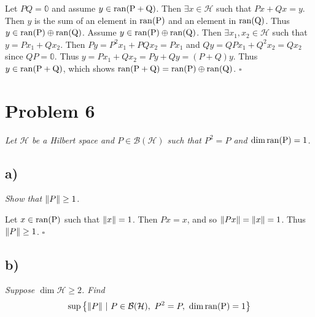 \documentclass[12pt]{article}
\theoremstyle{plain}
\begin{document}
Let $PQ = \mathbb{0}$ and assume $y \in \rm{ran}(P + Q)$.  Then $\exists x \in \mathcal{H}$ such that $Px + Qx = y$.  Then $y$ is the sum of an element in $\rm{ran}(P)$ and an element in $\rm{ran}(Q)$.  Thus $y \in \rm{ran}(P) \oplus \rm{ran}(Q)$.  Assume $y \in \rm{ran}(P) \oplus \rm{ran}(Q)$.  Then $\exists x_1, x_2 \in \mathcal{H}$ such that $y = Px_1 + Qx_2$.  Then $Py = P^2x_1 + PQ x_2 = Px_1$ and $Qy = QPx_1 + Q^2x_2 = Qx_2$ since $QP = \mathbb{0}$.  Thus $y = Px_1 + Qx_2 = Py + Qy = (P + Q)y$.  Thus $y \in \rm{ran}(P + Q)$, which shows $\rm{ran}(P + Q) = \rm{ran}(P)\oplus\rm{ran}(Q)$. \hfill $\square$


\section*{Problem 6}
\emph{Let $\mathcal{H}$ be a Hilbert space and $P \in \mathcal{B}(\mathcal{H})$ such that $P^2 = P$ and $\dim\rm{ran}(P) = 1$.}

\subsection*{ a)}
\emph{Show that $\norm{P} \geq 1$.} \medskip

Let $x \in \rm{ran}(P)$ such that $\norm{x} = 1$.  Then $Px = x$, and so $\norm{Px} = \norm{x} = 1$.  Thus $\norm{P} \geq 1$. \hfill $\square$

\subsection*{ b)}
\emph{Suppose $\dim\mathcal{H} \geq 2$.  Find}
\begin{align*}
    \sup\left\{\norm{P}\ |\ P\in\mathcal{B}(\mathcal{H}),\ P^2 = P,\ \dim\rm{ran}(P) = 1\right\}
\end{align*}
\end{document}
